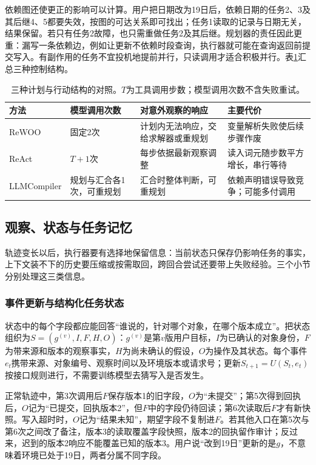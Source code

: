 依赖图还使更正的影响可以计算。用户把日期改为19日后，依赖日期的任务2、3及其后继4、5都要失效，按图的可达关系即可找出；任务1读取的记录与日期无关，结果保留。若只有任务2故障，也只需重做任务2及其后继。规划器的责任因此更重：漏写一条依赖边，例如让更新不依赖时段查询，执行器就可能在查询返回前提交写入。有副作用的任务不宜投机地提前并行，只读调用才适合积极并行。表\ref{tab:nlp-execution-planning-compare}汇总三种控制结构。

\begin{table}[htbp]
\centering
\small
\begin{tabular}{p{21mm}p{21mm}p{25mm}p{28mm}}
\toprule
方法 & 模型调用次数 & 对意外观察的响应 & 主要代价 \\
\midrule
ReWOO & 固定2次 & 计划内无法响应，交给求解器或重规划 & 变量解析失败使后续步骤作废 \\
ReAct & $T{+}1$次 & 每步依据最新观察调整 & 读入词元随步数平方增长，串行等待 \\
LLMCompiler & 规划与汇合各1次，可重规划 & 汇合时整体判断，可重规划 & 依赖声明错误导致竞争；可能多付调用 \\
\bottomrule
\end{tabular}
\caption{三种计划与行动结构的对照。$T$为工具调用步数；模型调用次数不含失败重试。}
\label{tab:nlp-execution-planning-compare}
\end{table}

\subsection{观察、状态与任务记忆}
\label{sec:nlp-execution-state-memory}

轨迹变长以后，执行器要有选择地保留信息：当前状态只保存仍影响任务的事实，上下文装不下的历史要压缩或按需取回，跨回合尝试还要带上失败经验。三个小节分别处理这三类信息。

\subsubsection{事件更新与结构化任务状态}
\label{sec:nlp-execution-state-update}

状态中的每个字段都应能回答“谁说的，针对哪个对象，在哪个版本成立”。把状态组织为$S=(g^{(v)},I,F,H,O)$：$g^{(v)}$是第$v$版用户目标，$I$为已确认的对象身份，$F$为带来源和版本的观察事实，$H$为尚未确认的假设，$O$为操作及其状态。每个事件$e_t$携带来源、对象编号、观察时间以及环境版本或请求号；更新$S_{t+1}=U(S_t,e_t)$按接口规则进行，不需要训练模型去猜写入是否发生。

正常轨迹中，第3次调用后$F$保存版本1的旧字段，$O$为“未提交”；第5次得到回执后，$O$记为“已提交，回执版本2”，但$F$中的字段仍待回读；第6次读取后$F$才有新快照。写入超时时，$O$记为“结果未知”，期望字段不复制进$F$。若其他入口在第5次与第6次之间改了备注，版本3的读取覆盖字段快照，版本2的回执留作审计；反过来，迟到的版本2响应不能覆盖已知的版本3。用户说“改到19日”更新的是$g$，不意味着环境已处于19日，两者分属不同字段。

